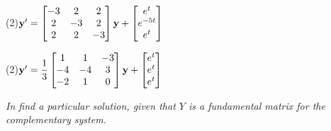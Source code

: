 \begin{exerciselistTwoColumn}
\item(2)\label{exer:10.7.9}$\mathbf{y}'=\begin{bmatrix}-3&2&2\\2&-3&2\\2&2&-3\end{bmatrix}\mathbf{y}+\begin{bmatrix}e^t\\e^{-5t}\\e^t\end{bmatrix}$

\item(2)\label{exer:10.7.10}$\mathbf{y}'=\dfrac{1}{3}\begin{bmatrix}1&1&-3\\-4&-4&3\\-2&1&0\end{bmatrix}\mathbf{y}+\begin{bmatrix}e^t\\e^t\\e^t\end{bmatrix}$
\end{exerciselistTwoColumn}
%
\textsl{In  find a
particular solution, given that $Y$ is a fundamental matrix for the
complementary system.}
